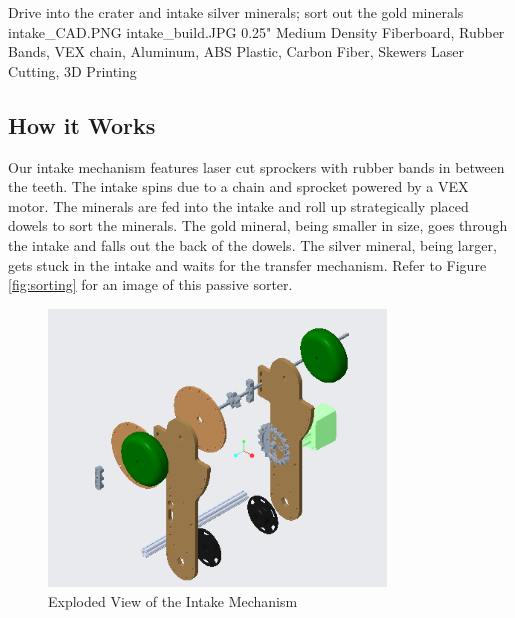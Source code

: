 {Drive into the crater and intake silver minerals; sort out the gold minerals} %
{intake_CAD.PNG}%
{intake_build.JPG}%
{0.25" Medium Density Fiberboard, Rubber Bands, VEX chain, Aluminum, ABS Plastic, Carbon Fiber, Skewers}%
{Laser Cutting, 3D Printing}%
\subsection*{How it Works}
Our intake mechanism features laser cut sprockers with rubber bands in between the teeth. The intake spins due to a chain and sprocket powered by a VEX motor. The minerals are fed into the intake and roll up strategically placed dowels to sort the minerals. The gold mineral, being smaller in size, goes through the intake and falls out the back of the dowels. The silver mineral, being larger, gets stuck in the intake and waits for the transfer mechanism. Refer to Figure \ref{fig:sorting} for an image of this passive sorter. 

\begin{figure}[h!]
\centering
\includegraphics[width=0.8\textwidth]{Design_Overview/exploded_intake.PNG}
\caption{Exploded View of the Intake Mechanism}
\label{fig:exploded_intake}
\end{figure}

